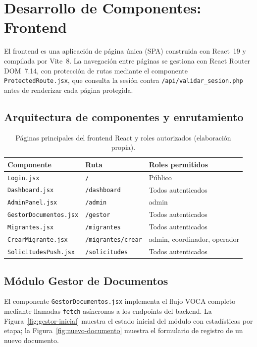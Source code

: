 \documentclass[10pt,letterpaper]{report}
\begin{document}
\section{Desarrollo de Componentes: Frontend}
\label{sec:frontend}

El frontend es una aplicación de página única (SPA) construida con React~19 y compilada por Vite~8. La navegación entre páginas se gestiona con React Router DOM~7.14, con protección de rutas mediante el componente \texttt{ProtectedRoute.jsx}, que consulta la sesión contra \texttt{/api/validar\_sesion.php} antes de renderizar cada página protegida.

\subsection{Arquitectura de componentes y enrutamiento}

\begin{table}[H]
\centering
\caption{Páginas principales del frontend React y roles autorizados (elaboración propia).}
\label{tab:paginas-react}
\begin{tabular}{p{} p{} p{}}
\toprule
\textbf{Componente} & \textbf{Ruta} & \textbf{Roles permitidos} \\
\midrule
\texttt{Login.jsx} & \texttt{/} & Público \\
\texttt{Dashboard.jsx} & \texttt{/dashboard} & Todos autenticados \\
\texttt{AdminPanel.jsx} & \texttt{/admin} & admin \\
\texttt{GestorDocumentos.jsx} & \texttt{/gestor} & Todos autenticados \\
\texttt{Migrantes.jsx} & \texttt{/migrantes} & Todos autenticados \\
\texttt{CrearMigrante.jsx} & \texttt{/migrantes/crear} & admin, coordinador, operador \\
\texttt{SolicitudesPush.jsx} & \texttt{/solicitudes} & Todos autenticados \\
\bottomrule
\end{tabular}
\end{table}

\subsection{Módulo Gestor de Documentos}

El componente \texttt{GestorDocumentos.jsx} implementa el flujo VOCA completo mediante llamadas \texttt{fetch} asíncronas a los endpoints del backend. La Figura~\ref{fig:gestor-inicial} muestra el estado inicial del módulo con estadísticas por etapa; la Figura~\ref{fig:nuevo-documento} muestra el formulario de registro de un nuevo documento.
\end{document}
